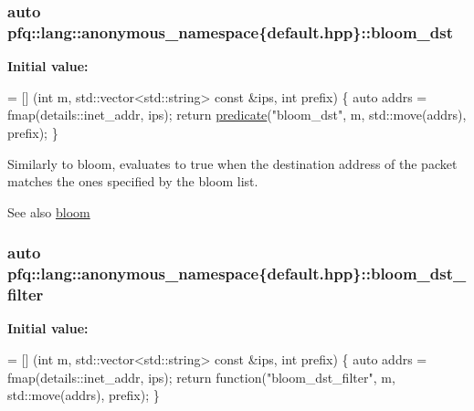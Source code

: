 \subsubsection[{\texorpdfstring{bloom\+\_\+dst}{bloom_dst}}]{\setlength{\rightskip}{0pt plus 5cm}auto pfq\+::lang\+::anonymous\+\_\+namespace\{default.\+hpp\}\+::bloom\+\_\+dst}\hypertarget{namespacepfq_1_1lang_1_1anonymous__namespace_02default_8hpp_03_ac1c667000a13acfbda8490d5748b91c4}{}\label{namespacepfq_1_1lang_1_1anonymous__namespace_02default_8hpp_03_ac1c667000a13acfbda8490d5748b91c4}
{\bfseries Initial value\+:}
\begin{DoxyCode}
= [] (\textcolor{keywordtype}{int} m, std::vector<std::string> \textcolor{keyword}{const} &ips, \textcolor{keywordtype}{int} prefix) \{
                                \textcolor{keyword}{auto} addrs = fmap(details::inet\_addr, ips);
                                \textcolor{keywordflow}{return} \hyperlink{namespacepfq_1_1lang_aca9adafc436b7f851621b979fa1aaf88}{predicate}(\textcolor{stringliteral}{"bloom\_dst"}, m, std::move(addrs), prefix);
                          \}
\end{DoxyCode}
Similarly to {\ttfamily bloom}, evaluates to {\ttfamily true} when the destination address of the packet matches the ones specified by the bloom list. \begin{DoxySeeAlso}{See also}
\hyperlink{namespacepfq_1_1lang_1_1anonymous__namespace_02default_8hpp_03_abfcd230137acb93cfd99f7a0a7c1f17f}{bloom} 
\end{DoxySeeAlso}
\subsubsection[{\texorpdfstring{bloom\+\_\+dst\+\_\+filter}{bloom_dst_filter}}]{\setlength{\rightskip}{0pt plus 5cm}auto pfq\+::lang\+::anonymous\+\_\+namespace\{default.\+hpp\}\+::bloom\+\_\+dst\+\_\+filter}\hypertarget{namespacepfq_1_1lang_1_1anonymous__namespace_02default_8hpp_03_a71aa2d21ceb343786b3911801eb0741b}{}\label{namespacepfq_1_1lang_1_1anonymous__namespace_02default_8hpp_03_a71aa2d21ceb343786b3911801eb0741b}
{\bfseries Initial value\+:}
\begin{DoxyCode}
= [] (\textcolor{keywordtype}{int} m, std::vector<std::string> \textcolor{keyword}{const} &ips, \textcolor{keywordtype}{int} prefix) \{
                                    \textcolor{keyword}{auto} addrs = fmap(details::inet\_addr, ips);
                                    \textcolor{keywordflow}{return} \textcolor{keyword}{function}(\textcolor{stringliteral}{"bloom\_dst\_filter"}, m, std::move(addrs), prefix);
                                \}
\end{DoxyCode}


